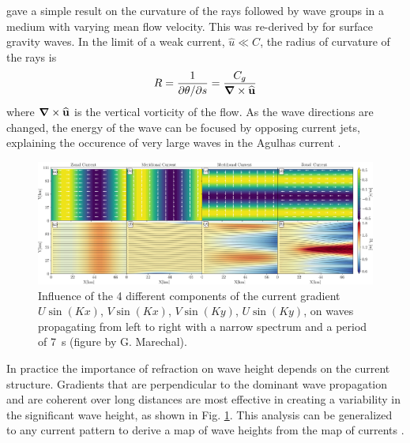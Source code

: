 \cite{Landau&Lifschitz1960} gave a simple result on the curvature of the rays followed by wave groups in a medium with varying mean flow velocity. 
This was re-derived by  \cite{Dysthe2001} for surface gravity waves. In the limit of a weak current, $\widehat{u} \ll C$, the radius of curvature 
of the rays is 
\begin{equation}
    R=\frac{1}{\partial \theta /\partial s}= \frac{C_g}{\mbox{\boldmath $\nabla$} \times \widehat{\mathbf
    u}}
\end{equation}
where $\mbox{\boldmath $\nabla$} \times \widehat{\mathbf
    u}$ is the vertical vorticity of the flow. %
As the wave directions are changed, the energy of the wave can be focused by opposing current jets, %
explaining the occurence of very large waves in the Agulhas current \citep{Lavrenov1986}. 

\begin{figure}[htb]
\centerline{\includegraphics[width=\textwidth]{FIGS_CH_CURRENT/cosine_current.png}}
  \caption{Influence of the 4 different components of the current gradient $U \sin (K x)$, $V \sin (K x)$,  $V \sin (K y)$, $U \sin (K y)$, on waves propagating from left to right with a narrow spectrum and a period of 7~s (figure by G. Marechal).}
\label{fig:cosinecur}
\end{figure}
In practice the importance of refraction on wave height depends on the current structure. Gradients that are perpendicular to the dominant wave propagation and are coherent over long distances are most effective in creating a variability in the significant wave height, as shown in Fig. \ref{fig:cosinecur}. This analysis can be generalized to any current pattern to derive a map of wave heights from the map of currents \citep{Wang&al.2023}. 

